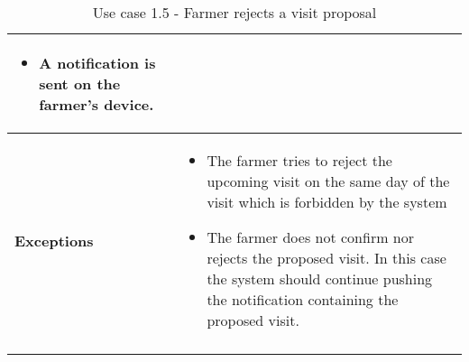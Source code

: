 \begin{longtable}[H]{ | l | p{10cm} | }
\begin{itemize}
    \item A notification is sent on the farmer's device.
\end{itemize}
\\ \hline
{\cellcolor[rgb]{0.753,0.753,0.753}}\textbf{Exceptions} & 
\begin{itemize}
    \item The farmer tries to reject the upcoming visit on the same day of the visit which is forbidden by the system
    \item The farmer does not confirm nor rejects the proposed visit. In this case the system should continue pushing the notification containing the proposed visit.
\end{itemize}
\\ \hline
\caption{Use case 1.5 - Farmer rejects a visit proposal}
\\
\end{longtable}